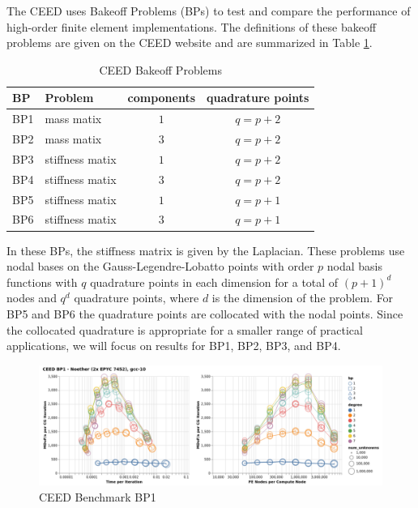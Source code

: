 The CEED uses Bakeoff Problems (BPs) to test and compare the performance of high-order finite element implementations.
The definitions of these bakeoff problems are given on the CEED website \cite{ceed-bps} and are summarized in Table \ref{table:ceedbps}.

\begin{table}[ht!]
\begin{center}
\begin{tabular}{l l c c}
  \toprule
  BP  & Problem         & components & quadrature points  \\
  \toprule
  BP1 & mass matix      & $1$        & $q = p + 2$        \\
  BP2 & mass matix      & $3$        & $q = p + 2$        \\
  \midrule
  BP3 & stiffness matix & $1$        & $q = p + 2$        \\
  BP4 & stiffness matix & $3$        & $q = p + 2$        \\
  \midrule
  BP5 & stiffness matix & $1$        & $q = p + 1$        \\
  BP6 & stiffness matix & $3$        & $q = p + 1$        \\
  \bottomrule
\end{tabular}
\end{center}
\caption{CEED Bakeoff Problems}
\label{table:ceedbps}
\end{table}

In these BPs, the stiffness matrix is given by the Laplacian.
These problems use nodal bases on the Gauss-Legendre-Lobatto points with order $p$ nodal basis functions with $q$ quadrature points in each dimension for a total of $\left( p + 1 \right)^d$ nodes and $q^d$ quadrature points, where $d$ is the dimension of the problem.
For BP5 and BP6 the quadrature points are collocated with the nodal points.
Since the collocated quadrature is appropriate for a smaller range of practical applications, we will focus on results for BP1, BP2, BP3, and BP4.

\begin{figure}[ht!]
\includegraphics[width=.99\linewidth]{../img/xsmmBlockedBP1Clip}
\caption{CEED Benchmark BP1}
\label{fig:bp1}
\end{figure}

